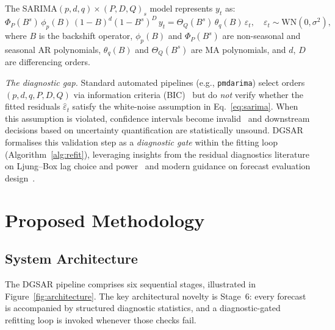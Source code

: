 \documentclass[sn-mathphys-num,pdflatex]{sn-jnl}
\begin{document}
The SARIMA$(p,d,q)\times(P,D,Q)_s$ model represents $y_t$ as:
\begin{equation}
\Phi_P(B^s)\,\phi_p(B)\,(1{-}B)^d(1{-}B^s)^D\,y_t
= \Theta_Q(B^s)\,\theta_q(B)\,\varepsilon_t,
\quad \varepsilon_t \sim \text{WN}(0,\sigma^2),
\label{eq:sarima}
\end{equation}
where $B$ is the backshift operator, $\phi_p(B)$ and $\Phi_P(B^s)$ are
non-seasonal and seasonal AR polynomials, $\theta_q(B)$ and
$\Theta_Q(B^s)$ are MA polynomials, and $d$, $D$ are differencing orders.

\textit{The diagnostic gap.}
Standard automated pipelines (e.g., \texttt{pmdarima}) select orders
$(p,d,q,P,D,Q)$ via information criteria (BIC)~\cite{akaike1974aic, schwarz1978bic, hyndman2008forecast}
but do \emph{not} verify whether the fitted residuals $\hat{\varepsilon}_t$ satisfy the
white-noise assumption in Eq.~\eqref{eq:sarima}. When this assumption
is violated, confidence intervals become invalid~\cite{box2015time}
and downstream decisions based on uncertainty quantification are
statistically unsound. DGSAR formalises this validation step
as a \emph{diagnostic gate} within the fitting loop
(Algorithm~\ref{alg:refit}), leveraging insights from the residual
diagnostics literature on Ljung--Box lag choice and power~\cite{ljungbox1978, hassani2020lb}
and modern guidance on forecast evaluation design~\cite{tashman2000oos, hewamalage2023pitfalls}.

\section{Proposed Methodology}
\label{sec:method}

\subsection{System Architecture}
\label{sec:architecture}

The DGSAR pipeline comprises six sequential stages, illustrated in
Figure~\ref{fig:architecture}. The key architectural novelty
is Stage~6: every forecast is accompanied by structured diagnostic
statistics, and a diagnostic-gated refitting loop is invoked whenever
those checks fail.
\end{document}
